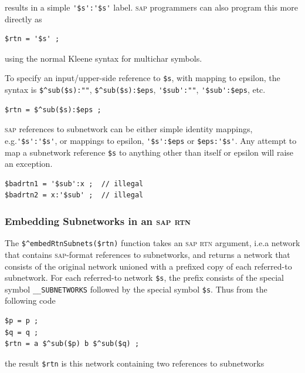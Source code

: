 \documentclass[letterpaper,12pt]{article}
\newcommand{\acro}{\textsc}
\begin{document}
\noindent
results in a simple \verb!'$s':'$s'! label.  \acro{sap} programmers can
also program this more directly as

\begin{Verbatim}[fontsize=\small]
$rtn = '$s' ;
\end{Verbatim}

\noindent
using the normal Kleene syntax for multichar symbols.


To specify an input/upper-side reference to \verb!$s!, with mapping to
epsilon, the syntax is \verb!$^sub($s):""!, \verb!$^sub($s):$eps!,
\verb!'$sub':""!, \verb!'$sub':$eps!, etc.

\begin{Verbatim}[fontsize=\small]
$rtn = $^sub($s):$eps ;
\end{Verbatim}

\acro{sap} references to subnetwork can be either simple identity
mappings, e.g.\@ \verb!'$s':'$s'!, or mappings to epsilon,
\verb!'$s':$eps! or \verb!$eps:'$s'!.  Any attempt to map a subnetwork
reference \verb!$s! to anything other than itself or epsilon will raise
an exception.

\begin{Verbatim}[fontsize=\small]
$badrtn1 = '$sub':x ;  // illegal
$badrtn2 = x:'$sub' ;  // illegal
\end{Verbatim}

\subsubsection{Embedding Subnetworks in an \acro{sap} \acro{rtn}}

The \verb!$^embedRtnSubnets($rtn)! function takes an \acro{sap}
\acro{rtn} argument, i.e.\@ a network that contains \acro{sap}-format
references to subnetworks, and returns a network that consists of the
original network unioned with a prefixed copy of each referred-to
subnetwork.  For each referred-to network \verb!$s!, the prefix consists
of the special symbol \verb!__SUBNETWORKS! followed by the special symbol
\verb!$s!.  Thus from the following code

\begin{Verbatim}[fontsize=\small]
$p = p ;
$q = q ;
$rtn = a $^sub($p) b $^sub($q) ;
\end{Verbatim}

\noindent
the result \verb!$rtn! is this network containing two references to subnetworks
\end{document}
